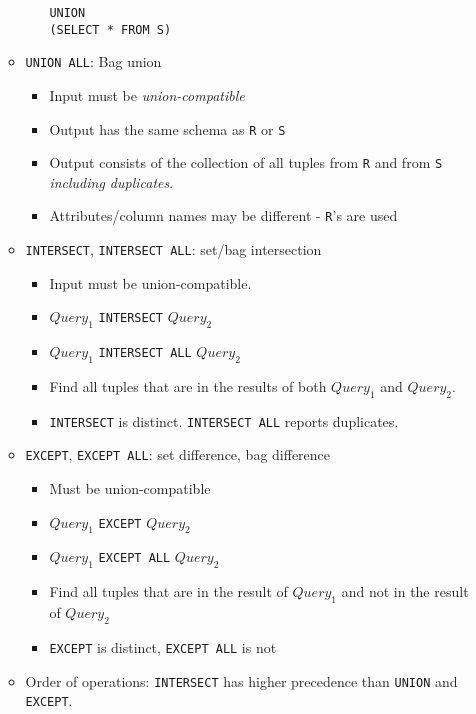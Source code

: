 \documentclass[landscape,8pt]{extarticle}
\newcommand{\code}{\lstinline}
\begin{document}
\begin{multicols}{4}
\begin{itemize}
\begin{itemize}
\begin{itemize}
            \code{UNION} \\
            \code{(SELECT * FROM S)} 
        \end{itemize}
        \item \code{UNION ALL}: Bag union
        \begin{itemize}
            \item Input must be \emph{union-compatible}
            \item Output has the same schema as \code{R} or \code{S}
            \item Output consists of the collection of all tuples from \code{R} and from \code{S} \emph{including duplicates}.
            \item Attributes/column names may be different - \code{R}'s are used
        \end{itemize}
        \item \code{INTERSECT}, \code{INTERSECT ALL}: set/bag intersection
        \begin{itemize}
            \item Input must be union-compatible.
            \item $Query_1$ \code{INTERSECT} $Query_2$ 
            \item $Query_1$ \code{INTERSECT ALL} $Query_2$
            \item Find all tuples that are in the results of both $Query_1$ and $Query_2$.
            \item \code{INTERSECT} is distinct. \code{INTERSECT ALL} reports duplicates.
        \end{itemize}
        \item \code{EXCEPT}, \code{EXCEPT ALL}: set difference, bag difference
        \begin{itemize}
            \item Must be union-compatible
            \item $Query_1$ \code{EXCEPT} $Query_2$
            \item $Query_1$ \code{EXCEPT ALL} $Query_2$
            \item Find all tuples that are in the result of $Query_1$ and not in the result of $Query_2$
            \item \code{EXCEPT} is distinct, \code{EXCEPT ALL} is not
        \end{itemize}
        \item Order of operations: \code{INTERSECT} has higher precedence than \code{UNION} and \code{EXCEPT}.
    \end{itemize}

\end{itemize}
\end{multicols}
\end{document}
